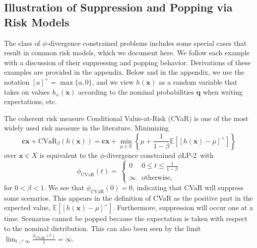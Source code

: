 \documentclass[opre,nonblindrev]{informs3} %
\newcommand{\R}{{\mathbb{R}}}
\newcommand{\E}{\mathbb{E}}
\newcommand{\e}[1]{\E \left[ #1 \right]}
\newcommand{\x}{\mathbf{x}}
\renewcommand{\c}{\mathbf{c}}
\newcommand{\q}{\mathbf{q}}
\newcommand{\plp}{$\phi$LP-2}
\begin{document}
\subsection{Illustration of Suppression and Popping via Risk Models}
\label{ssec:special_phi}

The class of $\phi$-divergence constrained problems includes some special cases that result in common risk models, which we document here. 
We follow each example with a discussion of their suppressing and popping behavior.
Derivations of these examples are provided in the appendix.
Below and in the appendix, we use the notation $[a]^+ = \max \{a,0\}$, and we view $h(\x)$ as a random variable that takes on values  $h_\omega(\x)$ according to the nominal probabilities $\q$ when writing expectations, etc. 


\begin{example}[CVaR]
	\label{ex:cvar}
	The coherent risk measure Conditional Value-at-Risk (CVaR) is one of the most widely used risk measure in the literature.
	Minimizing
	\[
		\c\x + \text{CVaR}_\beta(h(\x)) = \c\x + \min_{\mu \in \R} \left\{ \mu + \frac{1}{1-\beta}\e{\left[h(\x)-\mu\right]^+} \right\}
	\]
	over $\x \in X$ is equivalent to the $\phi$-divergence constrained \plp\ with
	\[
		\phi_{\text{CVaR}}(t) = \
		\begin{cases}
			0 & 0 \leq t \leq \frac{1}{1-\beta} \\
			\infty & \text{otherwise},
		\end{cases}
	\]
	for $0 < \beta < 1$.
	We see that $\phi_{\text{CVaR}}(0) = 0$, indicating that CVaR will suppress some scenarios.
	This appears in the definition of CVaR as the positive part in the expected value, $\e{[h(\x)-\mu]^+}$.
	Furthermore, suppression will occur one at a time.  
	Scenarios cannot be popped because the expectation is taken with respect to the nominal distribution.
	This can also been seen by the limit $\lim_{t \nearrow \infty}\frac{\phi_{\text{CVaR}}(t)}{t}= \infty$. 
	\Halmos 
\end{example}
\end{document}
